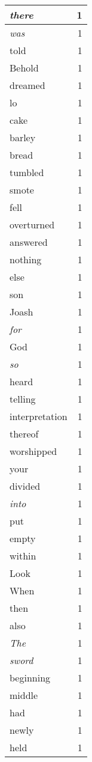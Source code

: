 \begin{center}
\begin{longtable}{l|r}
\emph{there} & 1\\ \hline 
\emph{was} & 1\\ \hline 
told & 1\\ \hline 
Behold & 1\\ \hline 
dreamed & 1\\ \hline 
lo & 1\\ \hline 
cake & 1\\ \hline 
barley & 1\\ \hline 
bread & 1\\ \hline 
tumbled & 1\\ \hline 
smote & 1\\ \hline 
fell & 1\\ \hline 
overturned & 1\\ \hline 
answered & 1\\ \hline 
nothing & 1\\ \hline 
else & 1\\ \hline 
son & 1\\ \hline 
Joash & 1\\ \hline 
\emph{for} & 1\\ \hline 
God & 1\\ \hline 
\emph{so} & 1\\ \hline 
heard & 1\\ \hline 
telling & 1\\ \hline 
interpretation & 1\\ \hline 
thereof & 1\\ \hline 
worshipped & 1\\ \hline 
your & 1\\ \hline 
divided & 1\\ \hline 
\emph{into} & 1\\ \hline 
put & 1\\ \hline 
empty & 1\\ \hline 
within & 1\\ \hline 
Look & 1\\ \hline 
When & 1\\ \hline 
then & 1\\ \hline 
also & 1\\ \hline 
\emph{The} & 1\\ \hline 
\emph{sword} & 1\\ \hline 
beginning & 1\\ \hline 
middle & 1\\ \hline 
had & 1\\ \hline 
newly & 1\\ \hline 
held & 1\\ \hline 

\end{longtable}
\end{center}
